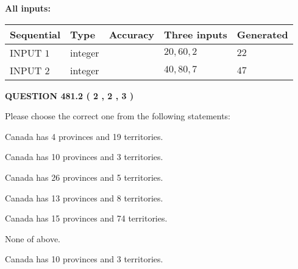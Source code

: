 \documentclass[12pt]{article}
\begin{document}
   
   
   
\noindent{}
   
   
   
   
\noindent\vspace{0.1in}\hspace{-0.08in} {\textbf{\Large{All inputs: }}}
   
   
  
  
\noindent\begin{tabular}{|l|l|l|l|l|}
\hline
 Sequential & Type & Accuracy & Three inputs & Generated \\ 
\hline
 
 
  INPUT $  1 $ & integer &  & $
 20
 , 
 60
 , 
 2
 $ & $ 22 $ 
 \\  \hline  
 
 
  INPUT $  2 $ & integer &  & $
 40
 , 
 80
 , 
 7
 $ & $ 47 $ 
 \\  \hline  
 \end{tabular}
   
   
  
\vspace{0.2in}
  
{\textbf{\Large{QUESTION
481.2 
 ( 2 , 2 , 3 )
}}}
  
  
Please choose the correct one from the following statements:
 
 
Canada has   4 provinces and  19 territories.
 
 
Canada has 10  provinces and 3 territories.
 
 
Canada has  26 provinces and  5 territories.
 
 
Canada has  13 provinces and  8 territories.
 
 
Canada has  15 provinces and  74 territories.
 
 
 None of above.
 
 
\noindent{}
 
 
Canada has 10  provinces and 3 territories.
 
 
\noindent{}
 
 
   
\end{document}
